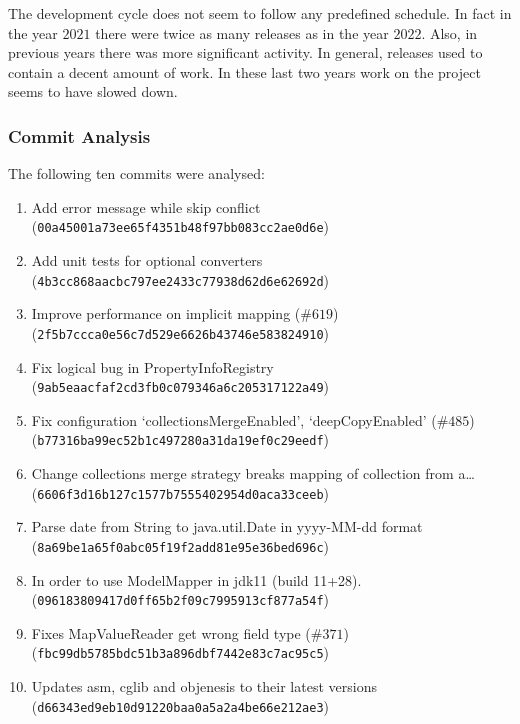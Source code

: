 \documentclass[12pt]{article}
\begin{document}
The development cycle does not seem to follow any predefined
schedule. In fact in the year $2021$ there were twice as many
releases as in the year $2022$. Also, in previous years there
was more significant activity. In general, releases used to
contain a decent amount of work. In these last two years work on
the project seems to have slowed down.

\subsubsection{Commit Analysis}

The following ten commits were analysed:

\begin{enumerate}
    \item Add error message while skip conflict
        (\texttt{00a45001a73ee65f4351b48f97bb083cc2ae0d6e})
    \item Add unit tests for optional converters
        (\texttt{4b3cc868aacbc797ee2433c77938d62d6e62692d})
    \item Improve performance on implicit mapping (\#$619$)
        \newline
        (\texttt{2f5b7ccca0e56c7d529e6626b43746e583824910})
    \item Fix logical bug in PropertyInfoRegistry
        (\texttt{9ab5eaacfaf2cd3fb0c079346a6c205317122a49})
    \item Fix configuration `collectionsMergeEnabled',
        `deepCopyEnabled' (\#$485$) \newline
        (\texttt{b77316ba99ec52b1c497280a31da19ef0c29eedf}) 
    \item Change collections merge strategy breaks mapping of
        collection from a\ldots \newline
        (\texttt{6606f3d16b127c1577b7555402954d0aca33ceeb})
    \item Parse date from String to java.util.Date in yyyy-MM-dd
        format \newline
        (\texttt{8a69be1a65f0abc05f19f2add81e95e36bed696c})
    \item In order to use ModelMapper in jdk11 (build 11+28).
        \newline
        (\texttt{096183809417d0ff65b2f09c7995913cf877a54f})
    \item Fixes MapValueReader get wrong field type (\#$371$)
        \newline
        (\texttt{fbc99db5785bdc51b3a896dbf7442e83c7ac95c5}) 
    \item Updates asm, cglib and objenesis to their latest
        versions \newline
        (\texttt{d66343ed9eb10d91220baa0a5a2a4be66e212ae3})
\end{enumerate}
\end{document}
